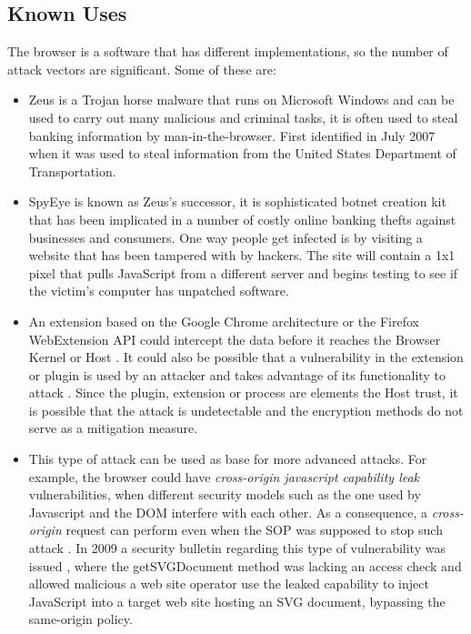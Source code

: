 \documentclass{sig-alternate-05-2015}
\begin{document}
  \subsection*{Known Uses} The browser is a software that has different implementations, so the number of attack vectors are significant. Some of these are:
      \begin{itemize}
        \item Zeus \cite{zeus} is a Trojan horse malware that runs on Microsoft Windows and can be used to carry out many malicious and criminal tasks, it is often used to steal banking information by man-in-the-browser. First identified in July 2007 when it was used to steal information from the United States Department of Transportation.
        \item SpyEye \cite{spyeye1} is known as Zeus's successor, it is sophisticated botnet creation kit that has been implicated in a number of costly online banking thefts against businesses and consumers. One way people get infected is by visiting a website that has been tampered with by hackers. The site will contain a 1x1 pixel that pulls JavaScript from a different server and begins testing to see if the victim's computer has unpatched software.
        \item An extension based on the Google Chrome architecture or the Firefox WebExtension API could intercept the data before it reaches the Browser Kernel or Host \cite{Paola2006}. It could also be possible that a vulnerability in the extension or plugin is used by an attacker and takes advantage of its functionality to attack \cite{Liu2012,Barth2010}. Since the plugin, extension or process are elements the Host trust, it is possible that the attack is undetectable and the encryption methods do not serve as a mitigation measure.
        \item This type of attack can be used as base for more advanced attacks. For example, the browser could have \textit{cross-origin javascript capability leak} vulnerabilities, when different security models such as the one used by Javascript and the DOM interfere with each other. As a consequence, a \textit{cross-origin} request can perform even when the SOP was supposed to stop such attack \cite{Barth2009}. In 2009 a security bulletin regarding this type of vulnerability was issued \cite{javacapab}, where the getSVGDocument method was lacking an access check and allowed malicious a web site operator use the leaked capability to inject JavaScript into a target web site hosting an SVG document, bypassing the same-origin policy.
      \end{itemize}
\end{document}
